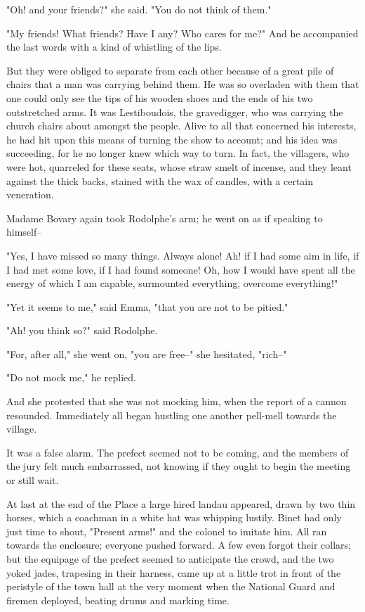 \documentclass{tufte-book}
\begin{document}
"Oh! and your friends?" she said. "You do not think of them."

"My friends! What friends? Have I any? Who cares for me?" And he
accompanied the last words with a kind of whistling of the lips.

But they were obliged to separate from each other because of a great
pile of chairs that a man was carrying behind them. He was so overladen
with them that one could only see the tips of his wooden shoes and the
ends of his two outstretched arms. It was Lestiboudois, the gravedigger,
who was carrying the church chairs about amongst the people. Alive to
all that concerned his interests, he had hit upon this means of turning
the show to account; and his idea was succeeding, for he no longer knew
which way to turn. In fact, the villagers, who were hot, quarreled for
these seats, whose straw smelt of incense, and they leant against the
thick backs, stained with the wax of candles, with a certain veneration.

Madame Bovary again took Rodolphe's arm; he went on as if speaking to
himself--

"Yes, I have missed so many things. Always alone! Ah! if I had some aim
in life, if I had met some love, if I had found someone! Oh, how I would
have spent all the energy of which I am capable, surmounted everything,
overcome everything!"

"Yet it seems to me," said Emma, "that you are not to be pitied."

"Ah! you think so?" said Rodolphe.

"For, after all," she went on, "you are free--" she hesitated, "rich--"

"Do not mock me," he replied.

And she protested that she was not mocking him, when the report of a
cannon resounded. Immediately all began hustling one another pell-mell
towards the village.

It was a false alarm. The prefect seemed not to be coming, and the
members of the jury felt much embarrassed, not knowing if they ought to
begin the meeting or still wait.

At last at the end of the Place a large hired landau appeared, drawn by
two thin horses, which a coachman in a white hat was whipping lustily.
Binet had only just time to shout, "Present arms!" and the colonel to
imitate him. All ran towards the enclosure; everyone pushed forward. A
few even forgot their collars; but the equipage of the prefect seemed
to anticipate the crowd, and the two yoked jades, trapesing in their
harness, came up at a little trot in front of the peristyle of the town
hall at the very moment when the National Guard and firemen deployed,
beating drums and marking time.
\end{document}
